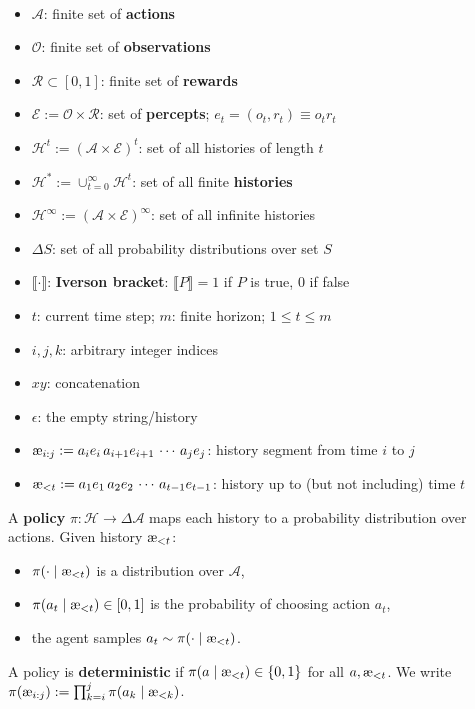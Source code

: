 \documentclass[fontsize=11pt, parskip=half]{scrartcl}
\newcommand{\cA}{\mathcal{A}}
\newcommand{\cO}{\mathcal{O}}
\newcommand{\cR}{\mathcal{R}}
\newcommand{\cE}{\mathcal{E}}
\newcommand{\cH}{\mathcal{H}}
\newcommand{\aes}{\textnormal{\ae}}
\begin{document}
\begin{definition}\label{def:spaces}\
\begin{itemize}\itemsep=2pt
    \item $\cA$: finite set of \textbf{actions}
    \item $\cO$: finite set of \textbf{observations}
    \item $\cR \subset [0,1]$: finite set of \textbf{rewards}
    \item $\cE := \cO \times \cR$: set of \textbf{percepts}; $e_t = (o_t, r_t) \equiv o_tr_t$
    \item $\cH^t := (\cA \times \cE)^t$: set of all histories of length $t$
    \item $\cH^* := \cup_{t=0}^\infty \cH^t$: set of all finite \textbf{histories}
    \item $\cH^\infty := (\cA \times \cE)^\infty$: set of all infinite histories
    \item $\Delta S$: set of all probability distributions over set $S$
    \item $\llbracket \cdot \rrbracket$: \textbf{Iverson bracket}: $\llbracket P \rrbracket = 1$ if $P$ is true, $0$ if false
    \item $t$: current time step; $m$: finite horizon; $1 \leq t \leq m$
    \item $i, j, k$: arbitrary integer indices
    \item $xy$: concatenation
    \item $\epsilon$: the empty string/history 
    \item $\aes_{i:j} := a_i e_i\, a_{i+1} e_{i+1} \,\cdots\, a_j e_j$: history segment from time $i$ to $j$
    \item $\aes_{<t} := a_1 e_1\, a_2 e_2 \,\cdots\, a_{t-1} e_{t-1}$: history up to (but not including) time $t$
\end{itemize}
\end{definition}

\begin{definition}[Policy $\pi$]\label{def:policy}
A \textbf{policy} $\pi : \cH \to \Delta \cA$ maps each history to a probability distribution over actions. Given history $\aes_{<t}$:
\begin{itemize}\itemsep=2pt
    \item $\pi(\cdot \mid \aes_{<t})$ is a distribution over $\cA$,
    \item $\pi(a_t \mid \aes_{<t}) \in [0,1]$ is the probability of choosing action $a_t$,
    \item the agent samples $a_t \sim \pi(\cdot \mid \aes_{<t})$.
\end{itemize}
A policy is \textbf{deterministic} if $\pi(a \mid \aes_{<t}) \in \{0,1\}$ for all $a, \aes_{<t}$.
We write $\pi(\aes_{i:j}) := \prod_{k=i}^j \pi(a_k \mid \aes_{<k})$.
\end{definition}
\end{document}
